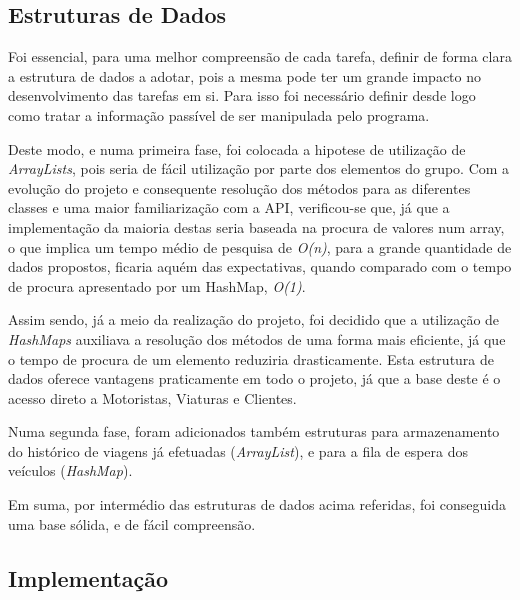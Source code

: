 \documentclass[a4paper]{article}
\begin{document}
\subsection{Estruturas de Dados}
\label{sec:4}

\hspace{3mm} Foi essencial, para uma melhor compreensão de cada tarefa, definir de forma clara a estrutura de dados a adotar, pois a mesma pode ter um grande impacto no desenvolvimento das tarefas em si. Para isso foi necessário definir desde logo como tratar a informação passível de ser manipulada pelo programa.
\par Deste modo, e numa primeira fase, foi colocada a hipotese de utilização de \emph{ArrayLists}, pois seria de fácil utilização por parte dos elementos do grupo. Com a evolução do projeto e consequente resolução dos métodos para as diferentes classes e uma maior familiarização com a API, verificou-se que, já que a implementação da maioria destas seria baseada na procura de valores num array, o que implica um tempo médio de pesquisa de \emph{O(n)}, para a grande quantidade de dados propostos, ficaria aquém das expectativas, quando comparado com o tempo de procura apresentado por um HashMap, \emph{O(1)}. 
\par Assim sendo, já a meio da realização do projeto, foi decidido que a utilização de \emph{HashMaps} auxiliava a resolução dos métodos de uma forma mais eficiente, já que o tempo de procura de um elemento reduziria drasticamente. Esta estrutura de dados oferece vantagens praticamente em todo o projeto, já que a base deste é o acesso direto a Motoristas, Viaturas e Clientes.
\par Numa segunda fase, foram adicionados também estruturas para armazenamento do histórico de viagens já efetuadas (\emph{ArrayList}), e para a fila de espera dos veículos (\emph{HashMap}).
\par Em suma, por intermédio das estruturas de dados acima referidas, foi conseguida uma base sólida, e de fácil compreensão.



\subsection{Implementação}
\label{sec:5}
\end{document}
